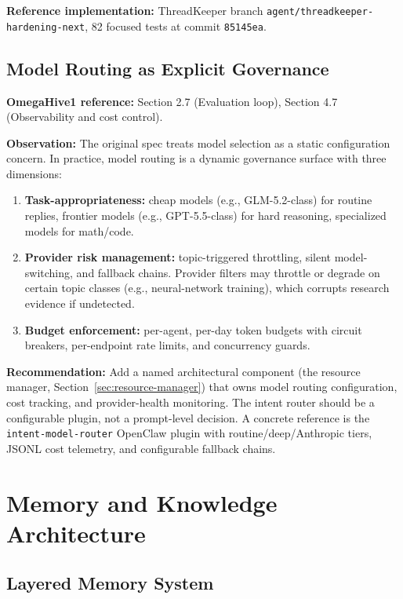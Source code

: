 \documentclass[11pt,a4paper]{article}
\begin{document}
\textbf{Reference implementation:} ThreadKeeper branch
\texttt{agent/threadkeeper-hardening-next}, 82 focused tests at commit
\texttt{85145ea}.

\subsection{Model Routing as Explicit Governance}
\label{sec:model-routing}

\textbf{OmegaHive1 reference:} Section 2.7 (Evaluation loop), Section 4.7 (Observability and cost control).

\textbf{Observation:} The original spec treats model selection as a static
configuration concern. In practice, model routing is a dynamic governance
surface with three dimensions:

\begin{enumerate}[nosep]
  \item \textbf{Task-appropriateness:} cheap models (e.g., GLM-5.2-class)
    for routine replies, frontier models (e.g., GPT-5.5-class) for hard
    reasoning, specialized models for math/code.
  \item \textbf{Provider risk management:} topic-triggered throttling,
    silent model-switching, and fallback chains. Provider filters may
    throttle or degrade on certain topic classes (e.g., neural-network
    training), which corrupts research evidence if undetected.
  \item \textbf{Budget enforcement:} per-agent, per-day token budgets with
    circuit breakers, per-endpoint rate limits, and concurrency guards.
\end{enumerate}

\textbf{Recommendation:} Add a named architectural component (the resource
manager, Section~\ref{sec:resource-manager}) that owns model routing
configuration, cost tracking, and provider-health monitoring. The intent
router should be a configurable plugin, not a prompt-level decision. A
concrete reference is the \texttt{intent-model-router} OpenClaw plugin with
routine/deep/Anthropic tiers, JSONL cost telemetry, and configurable
fallback chains.

\section{Memory and Knowledge Architecture}

\subsection{Layered Memory System}
\label{sec:memory}
\end{document}
